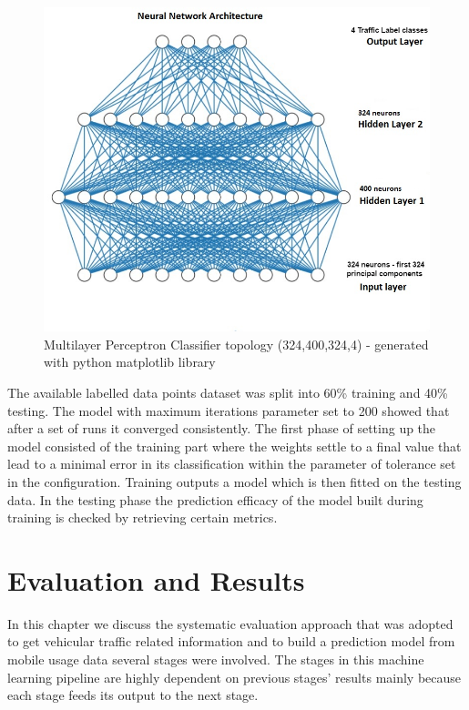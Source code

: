\documentclass[12pt, a4paper]{report}
\theoremstyle{definition}
\theoremstyle{definition}%
\theoremstyle{definition}%
\theoremstyle{definition}%
\theoremstyle{definition}%
\theoremstyle{definition}%
\begin{document}
\begin{figure}[!]	
	\includegraphics[scale=0.50]{ann_topology.jpg}
	\centering
	\caption[Multilayer Perceptron Classifier topology]{Multilayer Perceptron Classifier topology (324,400,324,4) - generated with python matplotlib library }
	\label{fig:ann_topology}
\end{figure}
 


The available labelled data points dataset was split into 60\% training and 40\% testing. The model with maximum iterations parameter set to 200 showed that after a set of runs it converged consistently. The first phase of setting up the model consisted of the training part where the weights settle to a final value that lead to a minimal error in its classification within the parameter of tolerance set in the configuration. Training outputs a model which is then fitted on the testing data. In the testing phase the prediction efficacy of the model built during training is checked by retrieving certain metrics.





\chapter{Evaluation and Results} \label{chapter:evaluation_and_results}

In this chapter we discuss the systematic evaluation approach that was adopted to get vehicular traffic related information and to build a prediction model from mobile usage data several stages were involved. The stages in this machine learning pipeline are highly dependent on previous stages' results mainly because each stage feeds its output to the next stage. 
\end{document}
